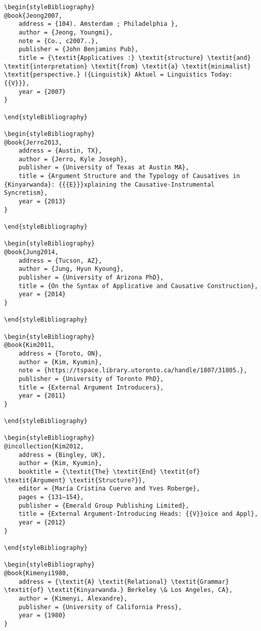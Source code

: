 \documentclass[output=paper,modfonts,nonflat]{langsci/langscibook}
\begin{document}
\begin{verbatim}
\begin{styleBibliography}
@book{Jeong2007,
	address = {104). Amsterdam ; Philadelphia },
	author = {Jeong, Youngmi},
	note = {Co., c2007..},
	publisher = {John Benjamins Pub},
	title = {\textit{Applicatives :} \textit{structure} \textit{and} \textit{interpretation} \textit{from} \textit{a} \textit{minimalist} \textit{perspective.} ({Linguistik} Aktuel = Linguistics Today: {{V}}},
	year = {2007}
}

\end{styleBibliography}

\begin{styleBibliography}
@book{Jerro2013,
	address = {Austin, TX},
	author = {Jerro, Kyle Joseph},
	publisher = {University of Texas at Austin MA},
	title = {Argument Structure and the Typology of Causatives in {Kinyarwanda}: {{{E}}}xplaining the Causative-Instrumental Syncretism},
	year = {2013}
}

\end{styleBibliography}

\begin{styleBibliography}
@book{Jung2014,
	address = {Tucson, AZ},
	author = {Jung, Hyun Kyoung},
	publisher = {University of Arizona PhD},
	title = {On the Syntax of Applicative and Causative Construction},
	year = {2014}
}

\end{styleBibliography}

\begin{styleBibliography}
@book{Kim2011,
	address = {Toroto, ON},
	author = {Kim, Kyumin},
	note = {https://tspace.library.utoronto.ca/handle/1807/31805.},
	publisher = {University of Toronto PhD},
	title = {External Argument Introducers},
	year = {2011}
}

\end{styleBibliography}

\begin{styleBibliography}
@incollection{Kim2012,
	address = {Bingley, UK},
	author = {Kim, Kyumin},
	booktitle = {\textit{The} \textit{End} \textit{of} \textit{Argument} \textit{Structure?}},
	editor = {María Cristina Cuervo and Yves Roberge},
	pages = {131–154},
	publisher = {Emerald Group Publishing Limited},
	title = {External Argument-Introducing Heads: {{V}}oice and Appl},
	year = {2012}
}

\end{styleBibliography}

\begin{styleBibliography}
@book{Kimenyi1980,
	address = {\textit{A} \textit{Relational} \textit{Grammar} \textit{of} \textit{Kinyarwanda.} Berkeley \& Los Angeles, CA},
	author = {Kimenyi, Alexandre},
	publisher = {University of California Press},
	year = {1980}
}


\end{verbatim}
\end{document}
